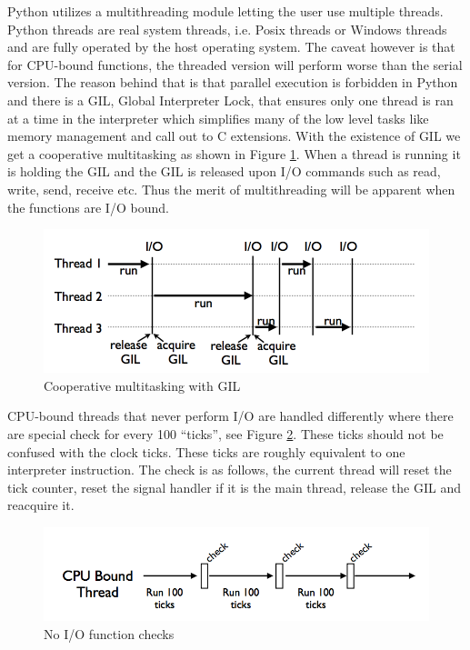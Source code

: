 \documentclass[10pt,twocolumn,letterpaper]{article}
\begin{document}
Python utilizes a multithreading module letting the user use multiple
threads. Python threads are real system threads, i.e. Posix threads
or Windows threads and are fully operated by the host operating system.
The caveat however is that for CPU-bound functions, the threaded version
will perform worse than the serial version. The reason behind that
is that parallel execution is forbidden in Python and there is a GIL,
Global Interpreter Lock, that ensures only one thread is ran at a
time in the interpreter which simplifies many of the low level tasks
like memory management and call out to C extensions. With the existence
of GIL we get a cooperative multitasking as shown in Figure \ref{fig:Cooperative-multitasking-with}.
When a thread is running it is holding the GIL and the GIL is released
upon I/O commands such as read, write, send, receive etc. Thus the
merit of multithreading will be apparent when the functions are I/O
bound. 

\begin{figure}[htbp] 
\begin{center}
\includegraphics[scale=0.3]{figure/threads_IO.png}
\end{center}
\caption{Cooperative multitasking with GIL}
\label{fig:Cooperative-multitasking-with}
\end{figure}


CPU-bound threads that never perform I/O are handled differently where
there are special check for every 100 ``ticks'', see Figure \ref{fig:No-I/O-function}.
These ticks should not be confused with the clock ticks. These ticks
are roughly equivalent to one interpreter instruction. The check is
as follows, the current thread will reset the tick counter, reset
the signal handler if it is the main thread, release the GIL and reacquire
it.

\begin{figure}[htbp] 
\begin{center}
\includegraphics[scale=0.3]{figure/threads_check.png}
\end{center}
\caption{No I/O function checks}
\label{fig:No-I/O-function}
\end{figure}
\end{document}
